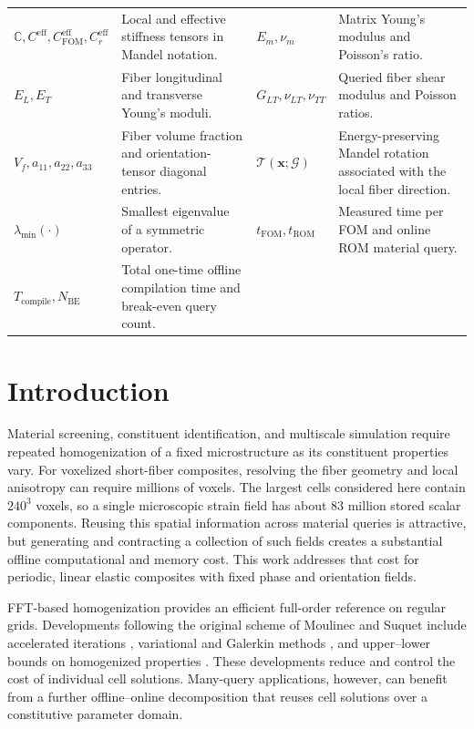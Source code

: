 \documentclass[pdflatex,sn-basic,Numbered]{sn-jnl}
\newcommand{\G}{\mathcal{G}}
\newcommand{\Ceff}{C^{\mathrm{eff}}}
\newcommand{\Cr}{C^{\mathrm{eff}}_r}
\newcommand{\Cfom}{C^{\mathrm{eff}}_{\mathrm{FOM}}}
\begin{document}
\begin{tabularx}{\textwidth}{@{}lXlX@{}}
\(\mathbb C,\Ceff,\Cfom,\Cr\) &
Local and effective stiffness tensors in Mandel notation. &
\(E_m,\nu_m\) &
Matrix Young's modulus and Poisson's ratio. \\

\(E_L,E_T\) &
Fiber longitudinal and transverse Young's moduli. &
\(G_{LT},\nu_{LT},\nu_{TT}\) &
Queried fiber shear modulus and Poisson ratios. \\

\(V_f,a_{11},a_{22},a_{33}\) &
Fiber volume fraction and orientation-tensor diagonal entries. &
\(\mathcal T(\boldsymbol x;\G)\) &
Energy-preserving Mandel rotation associated with the local fiber direction. \\

\(\lambda_{\min}(\cdot)\) &
Smallest eigenvalue of a symmetric operator. &
\(t_{\mathrm{FOM}},t_{\mathrm{ROM}}\) &
Measured time per FOM and online ROM material query. \\

\(T_{\mathrm{compile}},N_{\mathrm{BE}}\) &
Total one-time offline compilation time and break-even query count. & & \\

\bottomrule
\end{tabularx}
\endgroup

\section{Introduction}
\label{sec:introduction}

Material screening, constituent identification, and multiscale simulation
require repeated homogenization of a fixed microstructure as its constituent
properties vary. For voxelized short-fiber composites, resolving the fiber
geometry and local anisotropy can require millions of voxels. The largest
cells considered here contain \(240^3\) voxels, so a single microscopic strain
field has about 83 million stored scalar components. Reusing this spatial
information across material queries is attractive, but generating and
contracting a collection of such fields creates a substantial offline
computational and memory cost. This work addresses that cost for periodic,
linear elastic composites with fixed phase and orientation fields.

FFT-based homogenization provides an efficient full-order reference on regular
grids. Developments following the original scheme of Moulinec and Suquet
\cite{moulinec1998numerical} include accelerated iterations
\cite{eyre1999fast,michel2001augmented}, variational and Galerkin methods
\cite{brisard2012galerkin,vondrejc2014fft}, and upper--lower bounds on
homogenized properties \cite{vondrejc2015bounds}. These developments reduce
and control the cost of individual cell solutions. Many-query applications,
however, can benefit from a further offline--online decomposition that reuses
cell solutions over a constitutive parameter domain.
\end{document}
